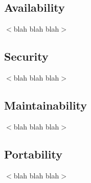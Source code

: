 \documentclass{scrreprt}
\begin{document}
  \subsection{Availability}
  $<$blah blah blah$>$

  \subsection{Security}
  $<$blah blah blah$>$

  \subsection{Maintainability}
  $<$blah blah blah$>$

  \subsection{Portability}
  $<$blah blah blah$>$
\end{document}
